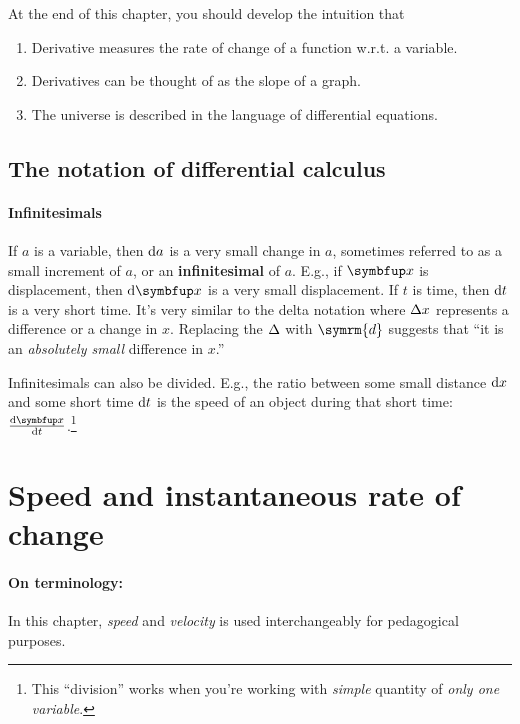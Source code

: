 At the end of this chapter, you should develop the intuition that
\begin{enumerate}[noitemsep]
  \item Derivative measures the rate of change of a function w.r.t. a variable.
  \item Derivatives can be thought of as the slope of a graph.
  \item The universe is described in the language of differential equations.
\end{enumerate}

\subsection{The notation of differential calculus}
\label{sec:derivatives-notation_of_differential_calculus}

\paragraph{Infinitesimals} If \(a\) is a variable, then \(\odif{a}\) is a very small change in \(a\), sometimes referred to as a small increment of \(a\), or an \textbf{infinitesimal} of \(a\). E.g., if \(\vv{x}\) is displacement, then \(\odif{\vv{x}}\) is a very small displacement. If \(t\) is time, then \(\odif{t}\) is a very short time. It's very similar to the delta notation where \(\adif{x}\) represents a difference or a change in \(x\). Replacing the \(\adif{\vphantom{a}}\) with \(\symrm{d}\) suggests that \enquote{it is an \emph{absolutely small} difference in \(x\).}

Infinitesimals can also be divided. E.g., the ratio between some small distance \(\odif{x}\) and some short time \(\odif{t}\) is the speed of an object during that short time: \(\odv{\vv{x}}{t}\).\footnote{This \enquote{division} works when you're working with \emph{simple} quantity of \emph{only one variable}.}

\section{Speed and instantaneous rate of change}
\label{sec:derivatives-speed_and_instantaneous_rate_of_change}

\paragraph{On terminology:} In this chapter, \emph{speed} and \emph{velocity} is used interchangeably for pedagogical purposes.

